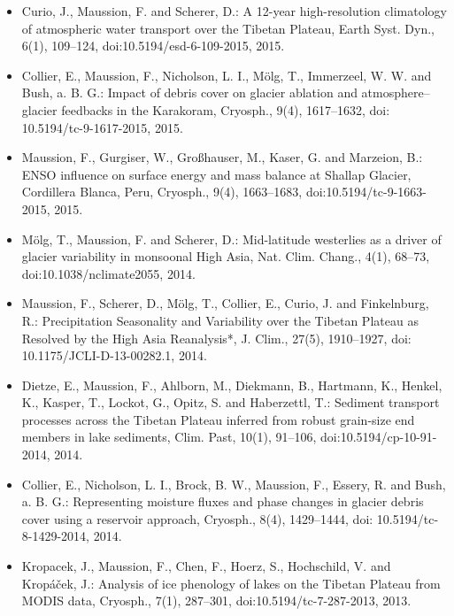 \begin{footnotesize}
\begin{itemize}[nosep]
\item {} 
Curio, J., Maussion, F. and Scherer, D.: A 12-year high-resolution climatology of atmospheric water transport over the
Tibetan Plateau, Earth Syst. Dyn., 6(1), 109--124, doi:10.5194/esd-6-109-2015, 2015.

\item {} 
Collier, E., Maussion, F., Nicholson, L. I., Mölg, T., Immerzeel, W. W. and Bush, a. B. G.: Impact of debris cover on
glacier ablation and atmosphere--glacier feedbacks in the Karakoram, Cryosph., 9(4), 1617--1632, doi:
10.5194/tc-9-1617-2015, 2015.

\item {} 
Maussion, F., Gurgiser, W., Großhauser, M., Kaser, G. and Marzeion, B.: ENSO influence on surface energy and mass
balance at Shallap Glacier, Cordillera Blanca, Peru, Cryosph., 9(4), 1663--1683, doi:10.5194/tc-9-1663-2015, 2015.

\item {} 
Mölg, T., Maussion, F. and Scherer, D.: Mid-latitude westerlies as a driver of glacier variability in monsoonal High
Asia, Nat. Clim. Chang., 4(1), 68--73, doi:10.1038/nclimate2055, 2014.

\item {} 
Maussion, F., Scherer, D., Mölg, T., Collier, E., Curio, J. and Finkelnburg, R.: Precipitation Seasonality and
Variability over the Tibetan Plateau as Resolved by the High Asia Reanalysis*, J. Clim., 27(5), 1910--1927, doi:
10.1175/JCLI-D-13-00282.1, 2014.

\item {} 
Dietze, E., Maussion, F., Ahlborn, M., Diekmann, B., Hartmann, K., Henkel, K., Kasper, T., Lockot, G., Opitz, S. and
Haberzettl, T.: Sediment transport processes across the Tibetan Plateau inferred from robust grain-size end members in
lake sediments, Clim. Past, 10(1), 91--106, doi:10.5194/cp-10-91-2014, 2014.

\item {} 
Collier, E., Nicholson, L. I., Brock, B. W., Maussion, F., Essery, R. and Bush, a. B. G.: Representing moisture fluxes
and phase changes in glacier debris cover using a reservoir approach, Cryosph., 8(4), 1429--1444, doi:
10.5194/tc-8-1429-2014, 2014.

\item {} 
Kropacek, J., Maussion, F., Chen, F., Hoerz, S., Hochschild, V. and Kropáček, J.: Analysis of ice phenology of lakes
on the Tibetan Plateau from MODIS data, Cryosph., 7(1), 287--301, doi:10.5194/tc-7-287-2013, 2013.


\end{itemize}
\end{footnotesize}
